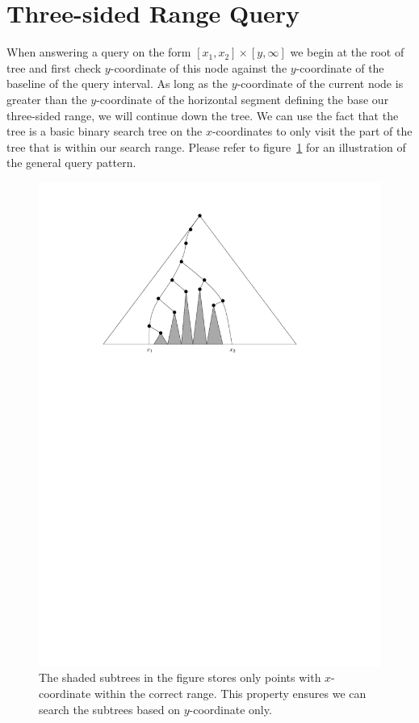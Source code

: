 \documentclass[twoside,11pt,openright]{report}
\begin{document}
\section{Three-sided Range Query}
When answering a query on the form $[x_1,x_2] \times [y,\infty]$ we begin at the root of tree and first check $y$-coordinate of this node against the $y$-coordinate of the baseline of the query interval. As long as the $y$-coordinate of the current node is greater than the $y$-coordinate of the horizontal segment defining the base our three-sided range, we will continue down the tree. We can use the fact that the tree is a basic binary search tree on the $x$-coordinates to only visit the part of the tree that is within our search range. Please refer to figure~\ref{fig:static_pst_query} for an illustration of the general query pattern.

\begin{figure}[h]
	\centering
	\includegraphics[scale=0.7]{../figures/internal_pst_query}
	\caption{The shaded subtrees in the figure stores only points with $x$-coordinate within the correct range. This property ensures we can search the subtrees based on $y$-coordinate only.}
	\label{fig:static_pst_query}
\end{figure}
\end{document}
